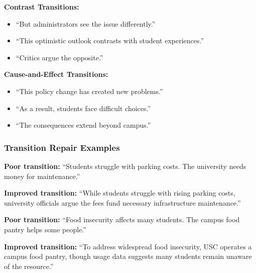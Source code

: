 \documentclass[12pt]{article}
\begin{document}
\begin{examplebox}
\textbf{Contrast Transitions:}
\begin{itemize}
    \item ``But administrators see the issue differently.''
    \item ``This optimistic outlook contrasts with student experiences.''
    \item ``Critics argue the opposite.''
\end{itemize}
\end{examplebox}

\begin{examplebox}
\textbf{Cause-and-Effect Transitions:}
\begin{itemize}
    \item ``This policy change has created new problems.''
    \item ``As a result, students face difficult choices.''
    \item ``The consequences extend beyond campus.''
\end{itemize}
\end{examplebox}

\newpage
\subsubsection{Transition Repair Examples}

\begin{beforebox}
\textbf{Poor transition:}
``Students struggle with parking costs. The university needs money for maintenance.''
\end{beforebox}

\begin{afterbox}
\textbf{Improved transition:}
``While students struggle with rising parking costs, university officials argue the fees fund necessary infrastructure maintenance.''
\end{afterbox}

\begin{beforebox}
\textbf{Poor transition:}
``Food insecurity affects many students. The campus food pantry helps some people.''
\end{beforebox}

\begin{afterbox}
\textbf{Improved transition:}
``To address widespread food insecurity, USC operates a campus food pantry, though usage data suggests many students remain unaware of the resource.''
\end{afterbox}
\end{document}
